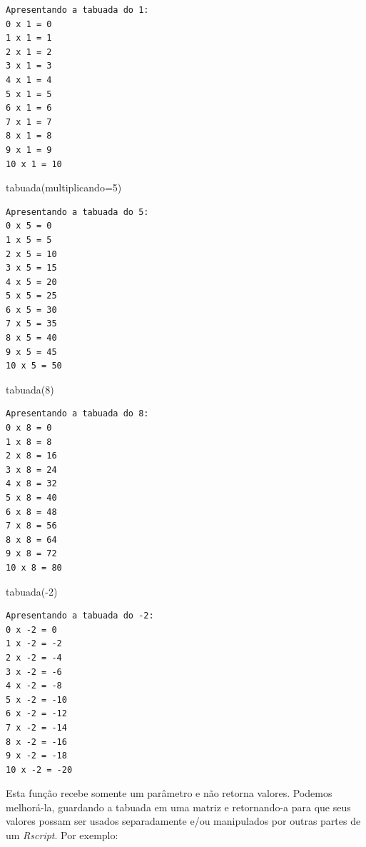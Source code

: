 \documentclass[
]{article}
\newenvironment{Shaded}{\begin{snugshade}}{\end{snugshade}}
\newcommand{\AttributeTok}[1]{\textcolor[rgb]{0.77,0.63,0.00}{#1}}
\newcommand{\DecValTok}[1]{\textcolor[rgb]{0.00,0.00,0.81}{#1}}
\newcommand{\FunctionTok}[1]{\textcolor[rgb]{0.00,0.00,0.00}{#1}}
\newcommand{\NormalTok}[1]{#1}
\newcommand{\SpecialCharTok}[1]{\textcolor[rgb]{0.00,0.00,0.00}{#1}}
\begin{document}
\begin{verbatim}
Apresentando a tabuada do 1:
0 x 1 = 0 
1 x 1 = 1 
2 x 1 = 2 
3 x 1 = 3 
4 x 1 = 4 
5 x 1 = 5 
6 x 1 = 6 
7 x 1 = 7 
8 x 1 = 8 
9 x 1 = 9 
10 x 1 = 10 
\end{verbatim}

\begin{Shaded}
\begin{Highlighting}[]
\FunctionTok{tabuada}\NormalTok{(}\AttributeTok{multiplicando=}\DecValTok{5}\NormalTok{)}
\end{Highlighting}
\end{Shaded}

\begin{verbatim}
Apresentando a tabuada do 5:
0 x 5 = 0 
1 x 5 = 5 
2 x 5 = 10 
3 x 5 = 15 
4 x 5 = 20 
5 x 5 = 25 
6 x 5 = 30 
7 x 5 = 35 
8 x 5 = 40 
9 x 5 = 45 
10 x 5 = 50 
\end{verbatim}

\begin{Shaded}
\begin{Highlighting}[]
\FunctionTok{tabuada}\NormalTok{(}\DecValTok{8}\NormalTok{)}
\end{Highlighting}
\end{Shaded}

\begin{verbatim}
Apresentando a tabuada do 8:
0 x 8 = 0 
1 x 8 = 8 
2 x 8 = 16 
3 x 8 = 24 
4 x 8 = 32 
5 x 8 = 40 
6 x 8 = 48 
7 x 8 = 56 
8 x 8 = 64 
9 x 8 = 72 
10 x 8 = 80 
\end{verbatim}

\begin{Shaded}
\begin{Highlighting}[]
\FunctionTok{tabuada}\NormalTok{(}\SpecialCharTok{{-}}\DecValTok{2}\NormalTok{)}
\end{Highlighting}
\end{Shaded}

\begin{verbatim}
Apresentando a tabuada do -2:
0 x -2 = 0 
1 x -2 = -2 
2 x -2 = -4 
3 x -2 = -6 
4 x -2 = -8 
5 x -2 = -10 
6 x -2 = -12 
7 x -2 = -14 
8 x -2 = -16 
9 x -2 = -18 
10 x -2 = -20 
\end{verbatim}

Esta função recebe somente um parâmetro e não retorna valores. Podemos
melhorá-la, guardando a tabuada em uma matriz e retornando-a para que
seus valores possam ser usados separadamente e/ou manipulados por outras
partes de um \emph{Rscript}. Por exemplo:
\end{document}
